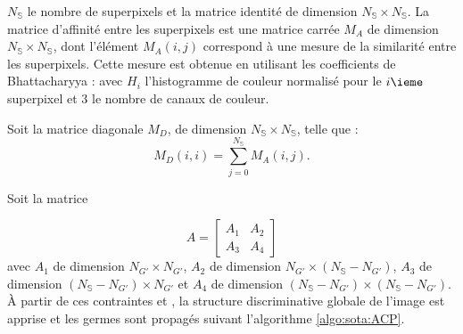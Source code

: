  $N_{\mathbb{S}}$ le nombre de superpixels et  la matrice identité de dimension $N_{\mathbb{S}} \times N_{\mathbb{S}}$. La matrice d'affinité entre les superpixels est une matrice carrée $M_{A}$ de dimension $N_{\mathbb{S}} \times  N_{\mathbb{S}}$, dont l'élément $M_{A}(i,j)$ correspond à une mesure de la similarité entre les  superpixels. Cette mesure est obtenue en utilisant les coefficients de Bhattacharyya :
avec $H_{i}$ l'histogramme de couleur normalisé pour le $i\ieme$ superpixel et $3$ le nombre de canaux de couleur.

Soit la matrice diagonale $M_{D}$, de dimension $N_{\mathbb{S}} \times N_{\mathbb{S}}$, telle que :
\begin{equation}
M_{D}(i,i) = \sum_{j=0}^{N_{\mathbb{S}}} M_{A}(i,j)\text{.}
\end{equation}

Soit la matrice

\begin{equation}
A = 
\begin{bmatrix}
A_{1} & A_{2}\\
A_{3} & A_{4}
\end{bmatrix}
\end{equation}
avec $A_{1}$ de dimension $N_{G'} \times N_{G'}$, $A_{2}$ de dimension $N_{G'} \times ( N_{\mathbb{S}} - N_{G'})$, $A_{3}$ de dimension $( N_{\mathbb{S}} - N_{G'}) \times  N_{G'}$ et $A_{4}$ de dimension $( N_{\mathbb{S}} - N_{G'}) \times ( N_{\mathbb{S}} - N_{G'})$.
À partir de ces  contraintes et , la structure discriminative globale de l'image est apprise et les germes sont propagés suivant l'algorithme 
\ref{algo:sota:ACP}.

